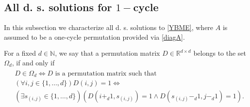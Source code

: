 \documentclass{article}
\theoremstyle{definition}\newtheorem{example}{Example}[section]
\def\NN{\mathbb{N}}
\def\RR{\mathbb{R}}
\begin{document}
	
	
	
	
	
	\subsection{All d. s. solutions for $1-$cycle}
	In this subsection we characterize all d. s. solutions to \eqref{YBME}, where $A$ is assumed to be a one-cycle permutation provided via \eqref{diagA}. 
	
	For a fixed $d\in\NN$, we say that a permutation matrix $D\in\RR^{d\times d}$ belongs to the set $\Omega_d$, if and only if 
	\begin{eqnarray}\label{Dperm}\begin{aligned}
			&D\in\Omega_d\Leftrightarrow\textrm{$D$ is a permutation matrix such that}\\
			&(\forall i,j\in\{1,\ldots,d\})D(i,j)=1\Leftrightarrow\\
			&\left(\exists s_{(i,j)}\in\{1,\ldots,d\}\right)\left(D(i+_d1,s_{(i,j)})=1 \wedge D(s_{(i,j)}-_d1,j-_d1)=1\right).\end{aligned}
	\end{eqnarray}
	
\end{document}
